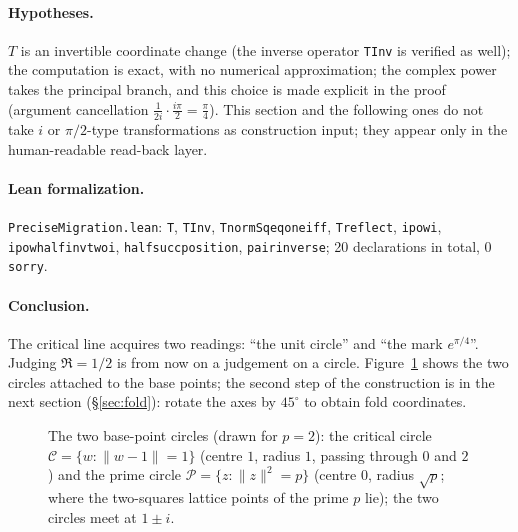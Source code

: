 \documentclass{article}
\renewcommand{\_}{\underscoreOrig\allowbreak}
\begin{document}
\paragraph{Hypotheses.} $T$ is an invertible coordinate change (the
inverse operator \texttt{TInv} is verified as well); the computation is
exact, with no numerical approximation; the complex power takes the
principal branch, and this choice is made explicit in the proof
(argument cancellation
$\frac{1}{2i}\cdot\frac{i\pi}{2}=\frac{\pi}{4}$). This section and the
following ones do not take $i$ or $\pi/2$-type transformations as
construction input; they appear only in the human-readable read-back
layer.

\paragraph{Lean formalization.} \texttt{PreciseMigration.lean}:
\texttt{T}, \texttt{TInv}, \texttt{T\_normSq\_eq\_one\_iff},
\texttt{T\_reflect}, \texttt{i\_pow\_i},
\texttt{i\_pow\_half\_inv\_two\_i}, \texttt{half\_succ\_position},
\texttt{pair\_inverse}; 20 declarations in total, 0 \texttt{sorry}.

\paragraph{Conclusion.} The critical line acquires two readings: ``the
unit circle'' and ``the mark $e^{\pi/4}$''. Judging $\Re=1/2$ is from
now on a judgement on a circle. Figure~\ref{fig:circles} shows the two
circles attached to the base points; the second step of the construction
is in the next section (\S\ref{sec:fold}): rotate the axes by
$45^\circ$ to obtain fold coordinates.

\begin{figure}[h]
\centering
{}
\caption{The two base-point circles (drawn for $p=2$): the critical
circle $\mathcal C=\{w:\|w-1\|=1\}$ (centre $1$, radius $1$, passing
through $0$ and $2$) and the prime circle
$\mathcal P=\{z:\|z\|^2=p\}$ (centre $0$, radius $\sqrt p$; where the
two-squares lattice points of the prime $p$ lie); the two circles meet at
$1\pm i$.}
\label{fig:circles}
\end{figure}
\end{document}
